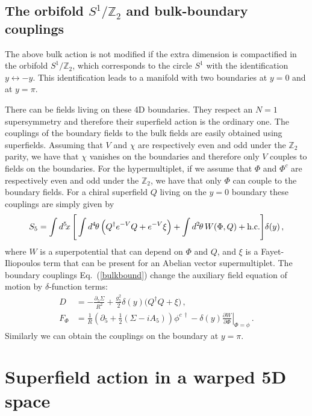 \documentclass[a4paper,12pt]{article}
\newcommand{\Zparity}{\ensuremath{\mathbb{Z}_2}}
\begin{document}
\subsection{The orbifold $S^1/\Zparity$ and bulk-boundary couplings}

The above bulk action is not modified if the extra dimension is
compactified in the orbifold $S^1/\Zparity$, which corresponds to the
circle $S^1$ with the identification $y\leftrightarrow -y$.  This
identification leads to a manifold with two boundaries at $y=0$ and at
$y=\pi$.

There can be fields living on these 4D boundaries. They respect an $N=1$
supersymmetry and therefore their superfield action is the ordinary one.
The couplings of the boundary fields to the bulk fields
are easily obtained using superfields. Assuming
that $V$ and $\chi$ are respectively even and odd under the $\Zparity$ parity,
 we have that $\chi$ vanishes 
on the boundaries and therefore  only $V$ 
couples to fields on the boundaries.  For the
hypermultiplet, if we assume that $\Phi$ and $\Phi^c$ are respectively
even and odd under the $\Zparity$, we have that only $\Phi$ can couple
to the boundary fields.  For a chiral superfield $Q$ living on the $y=0$
boundary
these couplings are simply given by
\begin{equation}
S_5=\int d^{5}\! x\, 
\Bigg[\int d^4\mspace{-2mu}\theta\,\Big(Q^{\dag} e^{-V} Q+e^{-V}\xi\Big) 
+\int d^2\mspace{-2mu}\theta\,
 W(\Phi,Q)+ \text{h.c.}\Bigg]\delta(y) \, ,
\label{bulkbound}
\end{equation}
where $W$ is a superpotential that can depend on 
$\Phi$ and $Q$, and $\xi$
is a Fayet-Iliopoulos term that can be present for an Abelian 
vector supermultiplet.  
The boundary couplings Eq.~(\ref{bulkbound})
change the auxiliary field equation of
motion by $\delta$-function terms:
\begin{align}
D &=  -\frac{\partial_{5} \Sigma}{R^2} + \frac{g^2_5}{2} \delta(y)
\bigl(Q^{\dag} Q + \xi \bigr)\, , \nonumber\\
F_{\Phi} & =\frac{1}{R}\left(\partial_{5}+
            \frac{1}{2}(\Sigma - i A_5) \right)\phi^{c\, \dag}
        - \delta(y) \left.
\frac{\partial W}{\partial \Phi}\right\vert_{\Phi=\phi}\, .
\end{align}
Similarly we can obtain the couplings on the boundary at $y=\pi$. 

\section{Superfield action in a warped 5D space}
\end{document}
